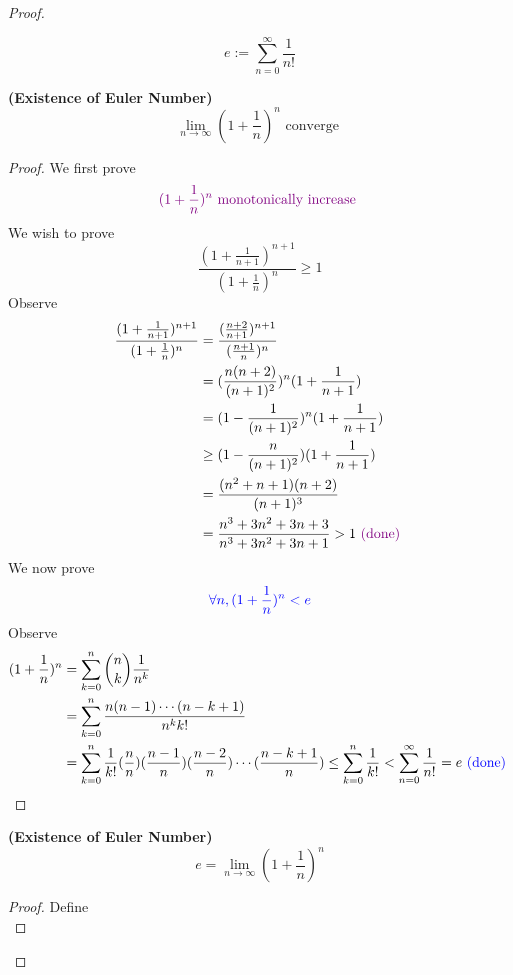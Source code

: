 \documentclass{report}
\begin{document}
\begin{proof}
\begin{definition}
\begin{equation}
e:=\sum_{n=0}^\infty \frac{1}{n!}
\end{equation}
\end{definition}
\begin{theorem}
\label{4.4.4}
\textbf{(Existence of Euler Number)}
\begin{equation}
\lim_{n\to\infty} (1+\frac{1}{n})^n\text{ converge }
\end{equation}
\end{theorem}
\begin{proof}
We first prove
\begin{equation}
\textcolor{violet}{(1+\frac{1}{n})^n\text{ monotonically increase }}
\end{equation}
We wish to prove
\begin{equation}
\frac{(1+\frac{1}{n+1})^{n+1}}{(1+\frac{1}{n})^n}\geq 1
\end{equation}
Observe
\begin{align}
\frac{(1+\frac{1}{n+1})^{n+1}}{(1+\frac{1}{n})^n}&=\frac{(\frac{n+2}{n+1})^{n+1}}{(\frac{n+1}{n})^n}\\
&=(\frac{n(n+2)}{(n+1)^2})^n(1+\frac{1}{n+1})\\
&=(1-\frac{1}{(n+1)^2})^n (1+\frac{1}{n+1})\\
&\geq (1-\frac{n}{(n+1)^2})(1+\frac{1}{n+1})\\
&=\frac{(n^2+n+1)(n+2)}{(n+1)^3}\\
&=\frac{n^3+3n^2+3n+3}{n^3+3n^2+3n+1}> 1\textcolor{violet}{\text{ (done) }}
\end{align}
We now prove
\begin{equation}
  \textcolor{blue}{\forall n,(1+\frac{1}{n})^n<e}
\end{equation}
Observe
\begin{align}
  (1+\frac{1}{n})^n&= \sum_{k=0}^n \binom{n}{k}\frac{1}{n^k}\\
  &=\sum_{k=0}^n \frac{n(n-1)\cdots (n-k+1)}{n^kk!}\\
  &=\sum_{k=0}^n \frac{1}{k!}(\frac{n}{n})(\frac{n-1}{n})(\frac{n-2}{n})\cdots (\frac{n-k+1}{n})\leq \sum_{k=0}^n \frac{1}{k!}<\sum_{n=0}^\infty \frac{1}{n!}=e\textcolor{blue}{\text{ (done) }}
\end{align}
\end{proof}
\begin{theorem}
\label{4.4.5}
\textbf{(Existence of Euler Number)} 
\begin{equation}
e=\lim_{n\to\infty}(1+\frac{1}{n})^n
\end{equation}
\end{theorem}
\begin{proof}
Define
\begin{equation}

\end{equation}
\end{proof}
\end{proof}
\end{document}
